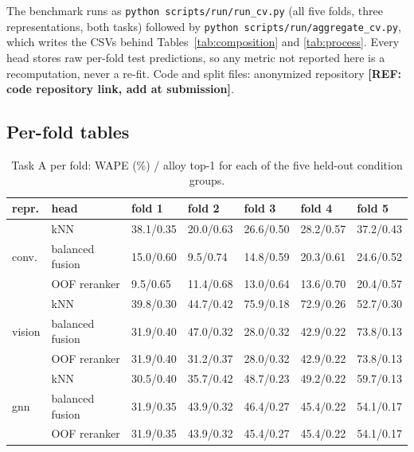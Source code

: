 \documentclass{article}
\newcommand{\needref}[1]{{\color{red}\textbf{[REF: #1]}}}
\begin{document}
The benchmark runs as \texttt{python scripts/run/run\_cv.py} (all five folds,
three representations, both tasks) followed by \texttt{python
scripts/run/aggregate\_cv.py}, which writes the CSVs behind
Tables~\ref{tab:composition} and \ref{tab:process}. Every head stores raw
per-fold test predictions, so any metric not reported here is a recomputation,
never a re-fit. Code and split files: anonymized repository \needref{code
repository link, add at submission}.

\subsection{Per-fold tables}

\begin{table}[h]
  \caption{Task A per fold: WAPE (\%) / alloy top-1 for each of the five
  held-out condition groups.}
  \label{tab:app_composition}
  \centering\footnotesize
  \begin{tabularx}{\linewidth}{@{}llXXXXX@{}}
    \toprule
    repr. & head & fold 1 & fold 2 & fold 3 & fold 4 & fold 5 \\
    \midrule
    \multirow{3}{*}{conv.}
      & kNN & 38.1/0.35 & 20.0/0.63 & 26.6/0.50 & 28.2/0.57 & 37.2/0.43 \\
      & balanced fusion & 15.0/0.60 & 9.5/0.74 & 14.8/0.59 & 20.3/0.61 & 24.6/0.52 \\
      & OOF reranker & 9.5/0.65 & 11.4/0.68 & 13.0/0.64 & 13.6/0.70 & 20.4/0.57 \\
    \midrule
    \multirow{3}{*}{vision}
      & kNN & 39.8/0.30 & 44.7/0.42 & 75.9/0.18 & 72.9/0.26 & 52.7/0.30 \\
      & balanced fusion & 31.9/0.40 & 47.0/0.32 & 28.0/0.32 & 42.9/0.22 & 73.8/0.13 \\
      & OOF reranker & 31.9/0.40 & 31.2/0.37 & 28.0/0.32 & 42.9/0.22 & 73.8/0.13 \\
    \midrule
    \multirow{3}{*}{gnn}
      & kNN & 30.5/0.40 & 35.7/0.42 & 48.7/0.23 & 49.2/0.22 & 59.7/0.13 \\
      & balanced fusion & 31.9/0.35 & 43.9/0.32 & 46.4/0.27 & 45.4/0.22 & 54.1/0.17 \\
      & OOF reranker & 31.9/0.35 & 43.9/0.32 & 45.4/0.27 & 45.4/0.22 & 54.1/0.17 \\
    \bottomrule
  \end{tabularx}
\end{table}
\end{document}
